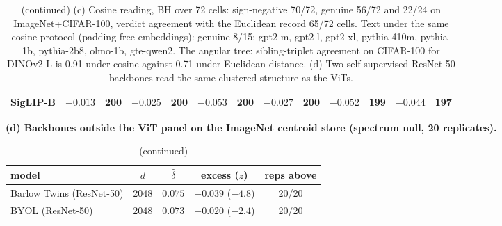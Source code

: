 \begin{table}[tbp]
\begin{tabular}{lcccccccccccc}
SigLIP-B & $-0.013$ & 200 & $-0.025$ & 200 & $-0.053$ & 200 & $-0.027$ & 200 & $-0.052$ & 199 & $-0.044$ & 197 \\
\bottomrule
\end{tabular}
\par\vspace{5pt}
\endgroup
\caption{(continued) (c) Cosine reading, BH over 72 cells: sign-negative 70/72, genuine 56/72 and 22/24 on ImageNet+CIFAR-100, verdict agreement with the Euclidean record 65/72 cells. Text under the same cosine protocol (padding-free embeddings): genuine 8/15: gpt2-m, gpt2-l, gpt2-xl, pythia-410m, pythia-1b, pythia-2b8, olmo-1b, gte-qwen2. The angular tree: sibling-triplet agreement on CIFAR-100 for DINOv2-L is 0.91 under cosine against 0.71 under Euclidean distance. (d) Two self-supervised ResNet-50 backbones read the same clustered structure as the ViTs. %
}
\end{table}
\begin{table}[tbp]\ContinuedFloat
\centering
\scriptsize
\setlength{\tabcolsep}{1.4pt}
\begingroup
\noindent\textbf{(d) Backbones outside the ViT panel on the ImageNet centroid store (spectrum null, 20 replicates).}\par\vspace{1.5pt}
\footnotesize
\setlength{\tabcolsep}{4pt}
\begin{tabular}{lcccc}
\toprule
model & $d$ & $\hat\delta$ & excess ($z$) & reps above \\
\midrule
Barlow Twins (ResNet-50) & 2048 & $0.075$ & $-0.039$ ($-4.8$) & 20/20 \\
BYOL (ResNet-50) & 2048 & $0.073$ & $-0.020$ ($-2.4$) & 20/20 \\
\bottomrule
\end{tabular}
\par\vspace{5pt}
\endgroup
\caption{(continued)}
\end{table}
